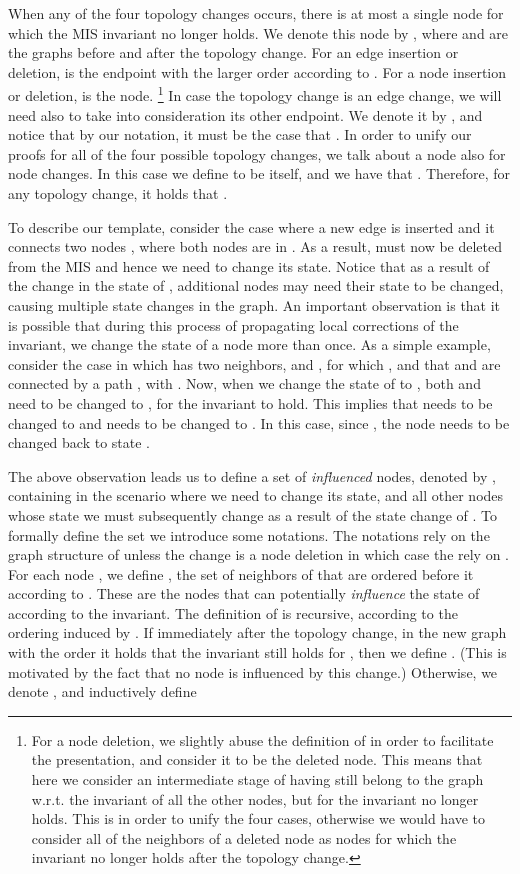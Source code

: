 When any of the four topology changes occurs, there is at most a single node for which the MIS invariant no longer holds. We denote this node by , where  and  are the graphs before and after the topology change. For an edge insertion or deletion,  is the endpoint with the larger order according to . For a node insertion or deletion,  is the  node. \footnote{For a node deletion, we slightly abuse the definition of  in order to facilitate the presentation, and consider it to be the deleted node. This means that here we consider an intermediate stage of having  still belong to the graph w.r.t. the \MIS invariant of all the other nodes, but for  the \MIS invariant no longer holds. This is in order to unify the four cases, otherwise we would have to consider all of the neighbors of a deleted node as nodes for which the \MIS invariant no longer holds after the topology change.}
In case the topology change is an edge change, we will need also to take into consideration its other endpoint. We denote it by , and notice that by our notation, it must be the case that . In order to unify our proofs for all of the four possible topology changes, we talk about a node  also for node changes. In this case we define  to be  itself, and we have that . Therefore, for any topology change, it holds that .

To describe our template, consider the case where a new edge is inserted and it connects two nodes , where both nodes are in . As a result,  must now be deleted from the MIS and hence we need to change its state. Notice that as a result of the change in the state of , additional nodes may need their state to be changed, causing multiple state changes in the graph.
An important observation is that it is possible that during this process of propagating local corrections of the \MIS invariant, we change the state of a node more than once. As a simple example, consider the case in which  has two neighbors,  and , for which , and that  and  are connected by a path , with . Now, when we change the state of  to , both  and  need to be changed to , for the \MIS invariant to hold. This implies that  needs to be changed to  and  needs to be changed to . In this case, since , the node  needs to be changed back to state .


The above observation leads us to define a set of \emph{influenced} nodes, denoted by , containing  in the scenario where we need to change its state, and all other nodes whose state we must  subsequently change as a result of the state change of .
To formally define the set  we introduce some notations. The notations rely on the graph structure of  unless the change is a node deletion in which case the rely on .
For each node , we define , the set of neighbors of  that are ordered before it according to .
These are the nodes that can potentially \emph{influence} the state of  according to the \MIS invariant. The definition of  is recursive, according to the ordering induced by .
If immediately after the topology change, in the new graph  with the order  it holds that the \MIS invariant still holds for , then we define . (This is motivated by the fact that no node is influenced by this change.) Otherwise, we denote , and inductively define


